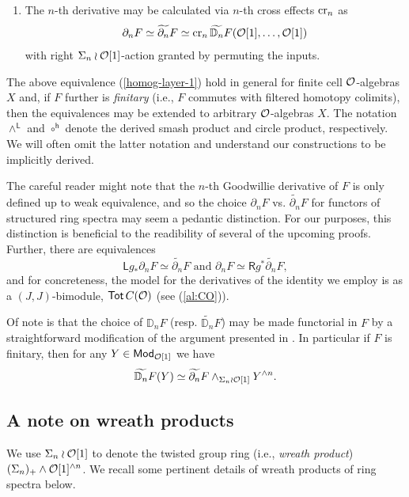 \begin{proposition}
\begin{enumerate}[label=(\roman*)]
    \item The $n$-th derivative may be calculated via $n$-th cross effects $\operatorname{cr}_n$ as \[\partial_n F \simeq \widetilde{\partial_n}F\simeq \operatorname{cr}_n \widetilde{\mathbb{D}_n} F (\mathcal{O}[1],\dots, \mathcal{O}[1])\] with right $\Sigma_n \wr \mathcal{O}[1]$-action granted by permuting the inputs.
\end{enumerate}
\end{proposition}

\begin{remark} 
    The above equivalence (\ref{homog-layer-1}) hold in general for finite cell $\mathcal{O}$-algebras $X$ and, if $F$ further is \textit{finitary} (i.e., $F$ commutes with filtered homotopy colimits), then the equivalences may be extended to arbitrary $\mathcal{O}$-algebras $X$. The notation $\wedge^{\mathsf{L}}$ and $\circ^{\mathsf{h}}$ denote the derived smash product and circle product, respectively. We will often omit the latter notation and understand our constructions to be implicitly derived.\end{remark}

    The careful reader might note that the $n$-th Goodwillie derivative of $F$ is only defined up to weak equivalence, and so the choice $\partial_n F$ vs. $\widetilde{\partial_n}F$ for functors of structured ring spectra may seem a pedantic distinction. For our purposes, this distinction is beneficial to the readibility of several of the upcoming proofs. Further, there are equivalences \[ \mathsf{L} g_* \partial_n F \simeq \widetilde{\partial_n} F \text{ and } \partial_n F \simeq \mathsf{R} g^* \widetilde{\partial_n}F, \] and for concreteness, the model for the derivatives of the identity we employ is as a $(J,J)$-bimodule, $\operatorname{\mathsf{Tot}} C(\mathcal{O})$ (see (\ref{al:CO})).
    

    Of note is that the choice of $\mathbb{D}_nF$ (resp. $\widetilde{\mathbb{D}_n}F$) may be made functorial in $F$ by a straightforward modification of the argument presented in \cite[2.7]{AC-1}. In particular if $F$ is finitary, then for any $Y\in \mathsf{Mod}_{\mathcal{O}[1]}$ we have \begin{equation} \label{eq:D_nF(Y)} \widetilde{\mathbb{D}_n} F(Y)\simeq \widetilde{\partial_n} F\wedge_{\Sigma_n \wr \mathcal{O}[1]} Y^{\wedge n}.\end{equation}


\subsection{A note on wreath products}
We use $\Sigma_n \wr \mathcal{O}[1]$ to denote the twisted group ring (i.e., \textit{wreath product}) $(\Sigma_n)_+\wedge \mathcal{O}[1]^{\wedge n}$. We recall some pertinent details of wreath products of ring spectra below.

